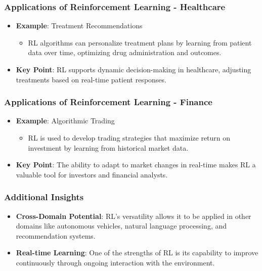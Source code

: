 \documentclass[aspectratio=169]{beamer}
\begin{document}
\begin{frame}[fragile]
    \frametitle{Applications of Reinforcement Learning - Healthcare}
    \begin{itemize}
        \item \textbf{Example}: Treatment Recommendations
        \begin{itemize}
            \item RL algorithms can personalize treatment plans by learning from patient data over time, optimizing drug administration and outcomes.
        \end{itemize}
        \item \textbf{Key Point}: RL supports dynamic decision-making in healthcare, adjusting treatments based on real-time patient responses.
    \end{itemize}
\end{frame}

\begin{frame}[fragile]
    \frametitle{Applications of Reinforcement Learning - Finance}
    \begin{itemize}
        \item \textbf{Example}: Algorithmic Trading
        \begin{itemize}
            \item RL is used to develop trading strategies that maximize return on investment by learning from historical market data.
        \end{itemize}
        \item \textbf{Key Point}: The ability to adapt to market changes in real-time makes RL a valuable tool for investors and financial analysts.
    \end{itemize}
\end{frame}

\begin{frame}[fragile]
    \frametitle{Additional Insights}
    \begin{itemize}
        \item \textbf{Cross-Domain Potential}: RL's versatility allows it to be applied in other domains like autonomous vehicles, natural language processing, and recommendation systems.
        \item \textbf{Real-time Learning}: One of the strengths of RL is its capability to improve continuously through ongoing interaction with the environment.
    \end{itemize}
\end{frame}
\end{document}
